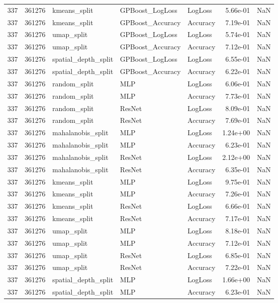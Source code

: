 \begin{tabular}{rrlllrr}
337 & 361276 & kmeans\_split & GPBoost\_LogLoss & LogLoss & 5.66e-01 & NaN \\
337 & 361276 & kmeans\_split & GPBoost\_Accuracy & Accuracy & 7.19e-01 & NaN \\
337 & 361276 & umap\_split & GPBoost\_LogLoss & LogLoss & 5.74e-01 & NaN \\
337 & 361276 & umap\_split & GPBoost\_Accuracy & Accuracy & 7.12e-01 & NaN \\
337 & 361276 & spatial\_depth\_split & GPBoost\_LogLoss & LogLoss & 6.55e-01 & NaN \\
337 & 361276 & spatial\_depth\_split & GPBoost\_Accuracy & Accuracy & 6.22e-01 & NaN \\
337 & 361276 & random\_split & MLP & LogLoss & 6.06e-01 & NaN \\
337 & 361276 & random\_split & MLP & Accuracy & 7.73e-01 & NaN \\
337 & 361276 & random\_split & ResNet & LogLoss & 8.09e-01 & NaN \\
337 & 361276 & random\_split & ResNet & Accuracy & 7.69e-01 & NaN \\
337 & 361276 & mahalanobis\_split & MLP & LogLoss & 1.24e+00 & NaN \\
337 & 361276 & mahalanobis\_split & MLP & Accuracy & 6.23e-01 & NaN \\
337 & 361276 & mahalanobis\_split & ResNet & LogLoss & 2.12e+00 & NaN \\
337 & 361276 & mahalanobis\_split & ResNet & Accuracy & 6.35e-01 & NaN \\
337 & 361276 & kmeans\_split & MLP & LogLoss & 9.75e-01 & NaN \\
337 & 361276 & kmeans\_split & MLP & Accuracy & 7.26e-01 & NaN \\
337 & 361276 & kmeans\_split & ResNet & LogLoss & 6.66e-01 & NaN \\
337 & 361276 & kmeans\_split & ResNet & Accuracy & 7.17e-01 & NaN \\
337 & 361276 & umap\_split & MLP & LogLoss & 8.18e-01 & NaN \\
337 & 361276 & umap\_split & MLP & Accuracy & 7.12e-01 & NaN \\
337 & 361276 & umap\_split & ResNet & LogLoss & 6.85e-01 & NaN \\
337 & 361276 & umap\_split & ResNet & Accuracy & 7.22e-01 & NaN \\
337 & 361276 & spatial\_depth\_split & MLP & LogLoss & 1.66e+00 & NaN \\
337 & 361276 & spatial\_depth\_split & MLP & Accuracy & 6.23e-01 & NaN \\

\end{tabular}

